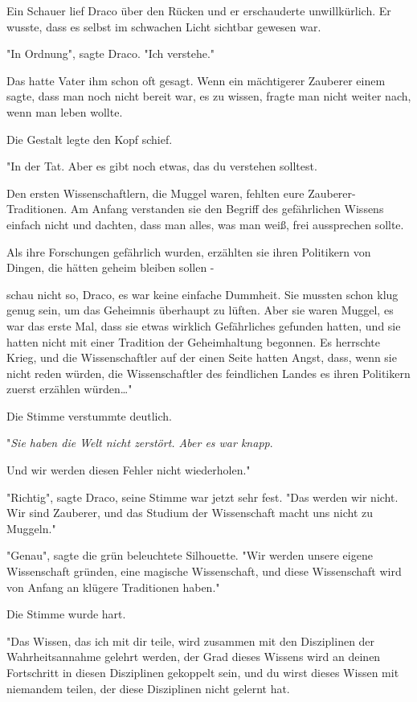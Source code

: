 {Ein Schauer lief Draco über den Rücken und er erschauderte unwillkürlich. Er wusste, dass es selbst im schwachen Licht sichtbar gewesen war.

"In Ordnung", sagte Draco. "Ich verstehe."

Das hatte Vater ihm schon oft gesagt. Wenn ein mächtigerer Zauberer einem sagte, dass man noch nicht bereit war, es zu wissen, fragte man nicht weiter nach, wenn man leben wollte.

Die Gestalt legte den Kopf schief.

"In der Tat. Aber es gibt noch etwas, das du verstehen solltest.

Den ersten Wissenschaftlern, die Muggel waren, fehlten eure Zauberer-Traditionen. Am Anfang verstanden sie den Begriff des gefährlichen Wissens einfach nicht und dachten, dass man alles, was man weiß, frei aussprechen sollte.

Als ihre Forschungen gefährlich wurden, erzählten sie ihren Politikern von Dingen, die hätten geheim bleiben sollen -

schau nicht so, Draco, es war keine einfache Dummheit. Sie mussten schon klug genug sein, um das Geheimnis überhaupt zu lüften. Aber sie waren Muggel, es war das erste Mal, dass sie etwas wirklich Gefährliches gefunden hatten, und sie hatten nicht mit einer Tradition der Geheimhaltung begonnen. Es herrschte Krieg, und die Wissenschaftler auf der einen Seite hatten Angst, dass, wenn sie nicht reden würden, die Wissenschaftler des feindlichen Landes es ihren Politikern zuerst erzählen würden…"

Die Stimme verstummte deutlich.

"\emph{Sie haben die Welt nicht zerstört. Aber es war knapp}.

Und wir werden diesen Fehler nicht wiederholen."

"Richtig", sagte Draco, seine Stimme war jetzt sehr fest. "Das werden wir nicht. Wir sind Zauberer, und das Studium der Wissenschaft macht uns nicht zu Muggeln."

"Genau", sagte die grün beleuchtete Silhouette. "Wir werden unsere eigene Wissenschaft gründen, eine magische Wissenschaft, und diese Wissenschaft wird von Anfang an klügere Traditionen haben."

Die Stimme wurde hart.

"Das Wissen, das ich mit dir teile, wird zusammen mit den Disziplinen der Wahrheitsannahme gelehrt werden, der Grad dieses Wissens wird an deinen Fortschritt in diesen Disziplinen gekoppelt sein, und du wirst dieses Wissen mit niemandem teilen, der diese Disziplinen nicht gelernt hat.

}
